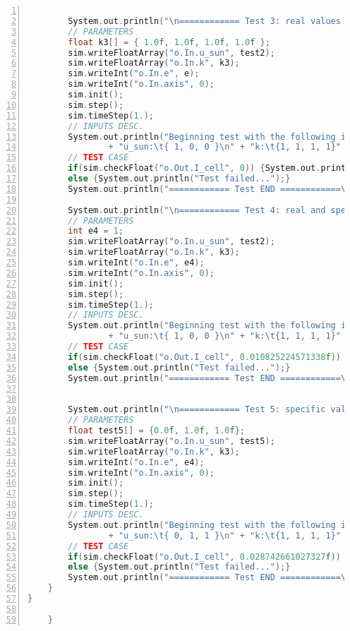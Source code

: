 \begin{appendices}
\begin{lstlisting}[frame=single,
numbers=left, basicstyle=\tiny, language = C++]
		
		System.out.println("\n============ Test 3: real values for u and k, e = 0 START ============");
		// PARAMETERS
		float k3[] = { 1.0f, 1.0f, 1.0f, 1.0f };
		sim.writeFloatArray("o.In.u_sun", test2);
		sim.writeFloatArray("o.In.k", k3);
		sim.writeInt("o.In.e", e);
		sim.writeInt("o.In.axis", 0);
		sim.init();
		sim.step();
		sim.timeStep(1.);
		// INPUTS DESC.
		System.out.println("Beginning test with the following inputs: \n" 
				+ "u_sun:\t{ 1, 0, 0 }\n" + "k:\t{1, 1, 1, 1}" + "\n" + "e:\t" + e);
		// TEST CASE
		if(sim.checkFloat("o.Out.I_cell", 0)) {System.out.println("Success!");} 
		else {System.out.println("Test failed...");}
		System.out.println("============ Test END ============\n");
		
		System.out.println("\n============ Test 4: real and specific values for all START ============");
		// PARAMETERS
		int e4 = 1;
		sim.writeFloatArray("o.In.u_sun", test2);
		sim.writeFloatArray("o.In.k", k3);
		sim.writeInt("o.In.e", e4);
		sim.writeInt("o.In.axis", 0);
		sim.init();
		sim.step();
		sim.timeStep(1.);
		// INPUTS DESC.
		System.out.println("Beginning test with the following inputs: \n" 
				+ "u_sun:\t{ 1, 0, 0 }\n" + "k:\t{1, 1, 1, 1}" + "\n" + "e:\t" + e4);
		// TEST CASE
		if(sim.checkFloat("o.Out.I_cell", 0.010825224571338f)) {System.out.println("Success!");} 
		else {System.out.println("Test failed...");}
		System.out.println("============ Test END ============\n");
		
		
		System.out.println("\n============ Test 5: specific values for all START ============");
		// PARAMETERS
		float test5[] = {0.0f, 1.0f, 1.0f};
		sim.writeFloatArray("o.In.u_sun", test5);
		sim.writeFloatArray("o.In.k", k3);
		sim.writeInt("o.In.e", e4);
		sim.writeInt("o.In.axis", 0);
		sim.init();
		sim.step();
		sim.timeStep(1.);
		// INPUTS DESC.
		System.out.println("Beginning test with the following inputs: \n" 
				+ "u_sun:\t{ 0, 1, 1 }\n" + "k:\t{1, 1, 1, 1}" + "\n" + "e:\t" + e4);
		// TEST CASE
		if(sim.checkFloat("o.Out.I_cell", 0.028742661027327f)) {System.out.println("Success!");} 
		else {System.out.println("Test failed...");}
		System.out.println("============ Test END ============\n");
	}
}

	}
\end{lstlisting}

\end{appendices}
